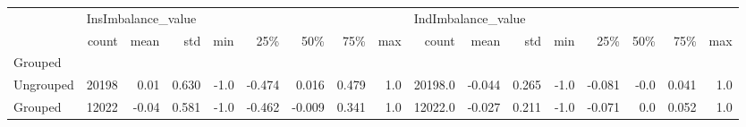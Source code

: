 \begin{tabular}{lrrrrrrrrrrrrrrrr}
\toprule
{} & \multicolumn{8}{l}{InsImbalance\_value} & \multicolumn{8}{l}{IndImbalance\_value} \\
{} &              count &  mean &    std &  min &    25\% &    50\% &    75\% &  max &              count &   mean &    std &  min &    25\% &  50\% &    75\% &  max \\
Grouped   &                    &       &        &      &        &        &        &      &                    &        &        &      &        &      &        &      \\
\midrule
Ungrouped &              20198 &  0.01 &  0.630 & -1.0 & -0.474 &  0.016 &  0.479 &  1.0 &            20198.0 & -0.044 &  0.265 & -1.0 & -0.081 & -0.0 &  0.041 &  1.0 \\
Grouped   &              12022 & -0.04 &  0.581 & -1.0 & -0.462 & -0.009 &  0.341 &  1.0 &            12022.0 & -0.027 &  0.211 & -1.0 & -0.071 &  0.0 &  0.052 &  1.0 \\
\bottomrule
\end{tabular}
